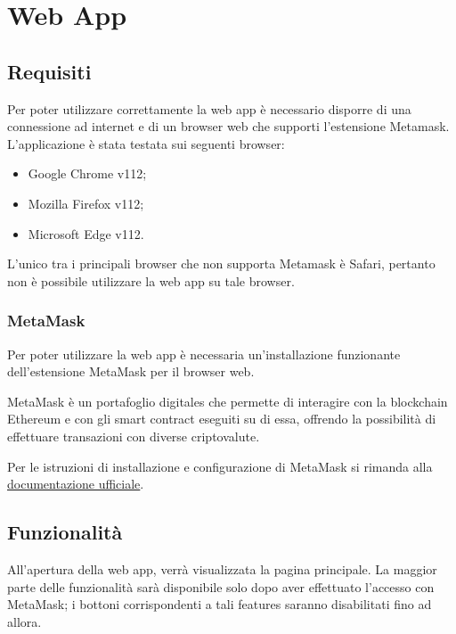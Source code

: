 \section{Web App}

\subsection{Requisiti}
Per poter utilizzare correttamente la web app è necessario disporre di una connessione ad internet e di un browser web che supporti l'estensione Metamask. L'applicazione è stata testata sui seguenti browser:
\begin{itemize}
    \item Google Chrome v112;
    \item Mozilla Firefox v112;
    \item Microsoft Edge v112.
\end{itemize}
L'unico tra i principali browser che non supporta Metamask è Safari, pertanto non è possibile utilizzare la web app su tale browser.

\subsubsection{MetaMask}
Per poter utilizzare la web app è necessaria un'installazione funzionante dell'estensione MetaMask per il browser web.

MetaMask è un portafoglio digitales che permette di interagire con la blockchain Ethereum e con gli smart contract eseguiti su di essa, offrendo la possibilità di effettuare transazioni con diverse criptovalute.

Per le istruzioni di installazione e configurazione di MetaMask si rimanda alla \href{https://support.metamask.io/hc/en-us/articles/360015489531-Getting-started-with-MetaMask}{documentazione ufficiale}.

\subsection{Funzionalità}
All'apertura della web app, verrà visualizzata la pagina principale. La maggior parte delle funzionalità sarà disponibile solo dopo aver effettuato l'accesso con MetaMask; i bottoni corrispondenti a tali features saranno disabilitati fino ad allora.

